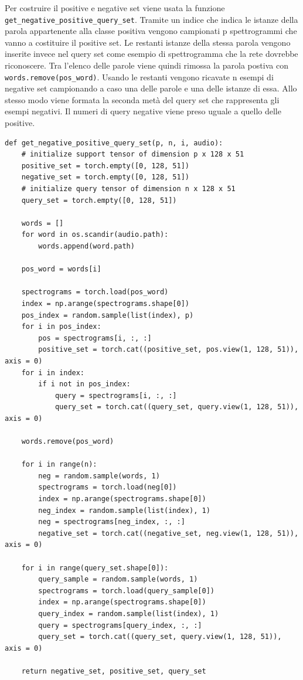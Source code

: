 \documentclass[12pt,a4paper,titlepage]{article}
\begin{document}
Per costruire il positive e negative set viene usata la funzione \texttt{get\_negative\_positive\_query\_set}.
Tramite un indice che indica le istanze della parola appartenente alla classe positiva vengono campionati p spettrogrammi che vanno a costituire il positive set. Le restanti istanze della stessa parola vengono inserite invece nel query set come esempio di spettrogramma che la rete dovrebbe riconoscere.
Tra l'elenco delle parole viene quindi rimossa la parola postiva con \texttt{words.remove(pos\_word)}.
Usando le restanti vengono ricavate n esempi di negative set campionando a caso una delle parole e una delle istanze di essa.
Allo stesso modo viene formata la seconda metà del query set che rappresenta gli esempi negativi. Il numeri di query negative viene preso uguale a quello delle positive.

\begin{lstlisting}[language=iPython,firstnumber=33, caption=Funzione \texttt{get\_negative\_positive\_query\_set}, label=get_negative_positive_query_set,captionpos=b]
def get_negative_positive_query_set(p, n, i, audio):
    # initialize support tensor of dimension p x 128 x 51
    positive_set = torch.empty([0, 128, 51])
    negative_set = torch.empty([0, 128, 51])
    # initialize query tensor of dimension n x 128 x 51
    query_set = torch.empty([0, 128, 51])
    
    words = []
    for word in os.scandir(audio.path):
        words.append(word.path)
        
    pos_word = words[i]

    spectrograms = torch.load(pos_word)
    index = np.arange(spectrograms.shape[0])
    pos_index = random.sample(list(index), p)
    for i in pos_index:
        pos = spectrograms[i, :, :]
        positive_set = torch.cat((positive_set, pos.view(1, 128, 51)), axis = 0)
    for i in index:
        if i not in pos_index:
            query = spectrograms[i, :, :]
            query_set = torch.cat((query_set, query.view(1, 128, 51)), axis = 0)
            
    words.remove(pos_word)

    for i in range(n):
        neg = random.sample(words, 1)
        spectrograms = torch.load(neg[0])
        index = np.arange(spectrograms.shape[0])
        neg_index = random.sample(list(index), 1)
        neg = spectrograms[neg_index, :, :]
        negative_set = torch.cat((negative_set, neg.view(1, 128, 51)), axis = 0)

    for i in range(query_set.shape[0]):
        query_sample = random.sample(words, 1)
        spectrograms = torch.load(query_sample[0])
        index = np.arange(spectrograms.shape[0])
        query_index = random.sample(list(index), 1)
        query = spectrograms[query_index, :, :]
        query_set = torch.cat((query_set, query.view(1, 128, 51)), axis = 0)

    return negative_set, positive_set, query_set
\end{lstlisting}
\end{document}
